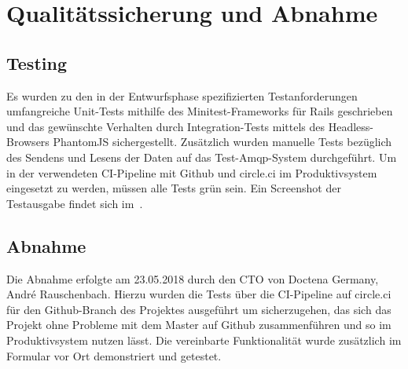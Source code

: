 \section{Qualitätssicherung und Abnahme} 
\label{sec:QualitätssicherungAbnahme}

\subsection{Testing}
\label{subsec:Testing}
Es wurden zu den in der Entwurfsphase spezifizierten Testanforderungen umfangreiche Unit-Tests mithilfe des Minitest-Frameworks für Rails geschrieben und das gewünschte Verhalten durch Integration-Tests mittels des Headless-Browsers PhantomJS sichergestellt. Zusätzlich wurden manuelle Tests bezüglich des Sendens und Lesens der Daten auf das Test-Amqp-System durchgeführt. Um in der verwendeten \ac{CI}-Pipeline mit Github und circle.ci im Produktivsystem eingesetzt zu werden, müssen alle Tests grün sein. Ein Screenshot der Testausgabe findet sich im~.

\subsection{Abnahme}
\label{subsec:Abnahme}
Die Abnahme erfolgte am 23.05.2018 durch den \ac{CTO} von Doctena Germany, André Rauschenbach. Hierzu wurden die Tests über die \ac{CI}-Pipeline auf circle.ci für den Github-Branch des Projektes ausgeführt um sicherzugehen, das sich das Projekt ohne Probleme mit dem Master auf Github zusammenführen und so im Produktivsystem nutzen lässt. Die vereinbarte Funktionalität wurde zusätzlich im Formular vor Ort demonstriert und getestet.

